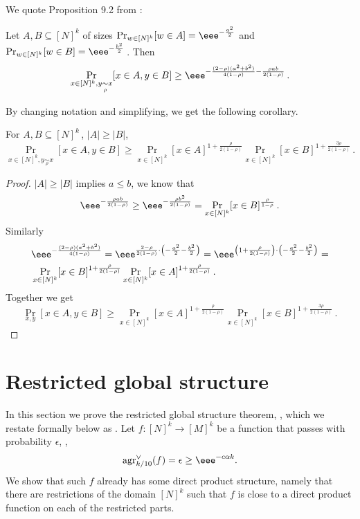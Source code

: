 \documentclass{toc}
\newcommand\f{f} %
\newcommand{\test}[2]{
	\ifx &#2&
	\textrm{agr}^{#1}
	\else	
	\textrm{agr}^{#1}_{#2}
	\fi}
\newcommand\cor[1]{\underset{\scriptscriptstyle#1}{\sim}} %
\begin{document}
We quote Proposition 9.2 from \cite{mossel2013reverse}:
\begin{proposition}
  Let $A,B \subseteq [N]^k$ of sizes $\Pr_{w\in [N]^k}[w\in A] = \eee^{-\frac{a^2}{2}}$ and $\Pr_{w\in [N]^k}[w\in B] = \eee^{-\frac{b^2}{2}}$\,.
%
Then  %
	\[\Pr_{x\in [N]^k, y \cor{\rho}x}[x\in A,y\in B] \geq \eee^{-\frac{(2-\rho)(a^2+b^2)}{4(1-\rho)} - \frac{\rho ab}{2(1-\rho)}}\,.\] %
\end{proposition}
By changing %
notation  %
and simplifying, we get the following corollary.
\begin{corollary}\label{cor:reverse hyper}
	For $A,B \subseteq [N]^k$\,, $|A| \geq |B|$,
	\[\Pr_{x\in [N]^k, y \cor{\rho}x}[x\in A,y\in B] \geq \Pr_{x\in [N]^k}[x\in A]^{1 + \frac{\rho}{2(1-\rho)}}\Pr_{x\in [N]^k}[x\in B]^{1+\frac{3\rho}{2(1-\rho)}}\,.\] %
\end{corollary}

\begin{proof}
	$|A|\geq |B|$ implies $a\leq b$, we know that
	\[\eee^{-\frac{\rho a b}{2(1-\rho)}} \geq \eee^{-\frac{\rho b^2}{2(1-\rho)}} = \Pr_{x\in [N]^k}[x\in B]^{\frac{\rho}{1-\rho}}\,.\] %
	Similarly
	\begin{align*}
	&\eee^{-\frac{(2-\rho)(a^2+b^2)}{4(1-\rho)}} = \eee^{\frac{2-\rho}{2(1-\rho)}\cdot\left(-\frac{a^2}{2} - \frac{b^2}{2}\right)} =
	\eee^{\left(1 + \frac{\rho}{2(1-\rho)}\right)\cdot\left(-\frac{a^2}{2} - \frac{b^2}{2}\right)}=\\
	&\Pr_{x\in [N]^k}[x\in B]^{1+\frac{\rho}{2(1-\rho)}} \Pr_{x\in [N]^k}[x\in A]^{1+\frac{\rho}{2(1-\rho)}}\,. %
	\end{align*}
	Together we get
	\[\Pr_{x,y}[x\in A,y\in B] \geq \Pr_{x\in [N]^k}[x\in A]^{1 + \frac{\rho}{2(1-\rho)}}\Pr_{x\in [N]^k}[x\in B]^{1+\frac{3\rho}{2(1-\rho)}}\,.\] %
\end{proof}


\section{Restricted global structure}\label{sec:local}
In this section we prove the restricted global structure theorem, , which we restate formally below as . Let $\f:[N]^k\rightarrow[M]^k$ be a function that passes   with probability $\epsilon$, \ie, \[\test{\vee}{k/10}(\f) = \epsilon\geq \eee^{-c\alpha k}.\] We show that such $\f$ already has some direct product structure, namely  %
that there are restrictions of the domain $[N]^k$ such that $\f$ is close to a direct product function on each of the restricted parts.
\end{document}

